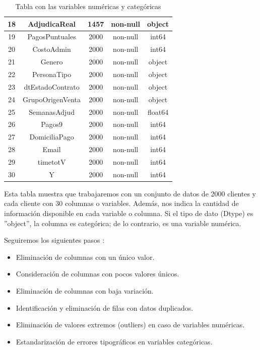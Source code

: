 \begin{table}[H]
\begin{tabular}{|c|c|c|c|c|}
        \hline
        \rowcolor{mediumgray}
        18 &  AdjudicaReal &        1457 & non-null &   object \\
        \hline
        19 &  PagosPuntuales &      2000 & non-null &   int64  \\
        \hline
        20 &  CostoAdmin &          2000 & non-null &   int64  \\
        \hline
        21 &  Genero &              2000 & non-null &   object \\
        \hline
        22 &  PersonaTipo &         2000 & non-null &   object \\
        \hline
        23 &  dtEstadoContrato &    2000 & non-null &   object \\
        \hline
        24 &  GrupoOrigenVenta &    2000 & non-null &   object \\
        \hline
        25 &  SemanasAdjud &        2000 & non-null &   float64 \\
        \hline
        26 &  Pagos9 &              2000 & non-null &   int64  \\
        \hline
        27 &  DomiciliaPago &      2000 & non-null &   int64  \\
        \hline
        28 &  Email &               2000 & non-null &   int64  \\
        \hline
        29 &  timetotV &            2000 & non-null &   int64  \\
        \hline
        30 &  Y &                   2000 & non-null &   int64 \\
        \hline  
    \end{tabular}
    \caption{Tabla con las variables numéricas y categóricas}
\end{table} \medskip
Esta tabla muestra que trabajaremos con un conjunto de datos de 2000 clientes y cada cliente con 30 columnas o variables. 
Además, nos indica la cantidad de información disponible en cada variable o columna. 
Si el tipo de dato (Dtype) es ''object'', la columna es categórica; de lo contrario, es una variable numérica.\medskip



Seguiremos los siguientes pasos \cite{Brown1} : \medskip
\begin{itemize}
    \item Eliminación de columnas con un único valor.
    \item Consideración de columnas con pocos valores únicos.
    \item Eliminación de columnas con baja variación.
    \item Identificación y eliminación de filas con datos duplicados.
    \item Eliminación de valores extremos (outliers) en caso de variables numéricas.
    \item Estandarización de errores tipográficos en variables categóricas.
\end{itemize}



